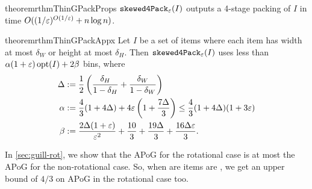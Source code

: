 \begin{restatable}{theorem}{rthmThinGPackProps}
\label{thm:thin-gpack-props}
$\operatorname{\mathtt{skewed4Pack}}_{\varepsilon}(I)$ outputs a 4-stage packing of $I$ in time
$O((1/\varepsilon)^{O(1/\varepsilon)} + n\log n)$.
\end{restatable}

\begin{restatable}{theorem}{rthmThinGPackAppx}
\label{thm:thin-gpack-appx}
Let $I$ be a set of items where each item has width at most $\delta_W$
or height at most $\delta_H$. Then $\operatorname{\mathtt{skewed4Pack}}_{\varepsilon}(I)$ uses less than
$\alpha(1+\varepsilon)\operatorname{opt}(I) + 2\beta$ bins, where
\begin{align*}
\Delta &:= \frac{1}{2}\left(\frac{\delta_H}{1-\delta_H}
    + \frac{\delta_W}{1-\delta_W}\right)
\\ \alpha &:= \frac{4}{3}(1+4\Delta) + 4\varepsilon\left(1 + \frac{7\Delta}{3}\right)
    \le \frac{4}{3}(1+4\Delta)(1+3\varepsilon)
\\ \beta &:= \frac{2\Delta(1+\varepsilon)}{\varepsilon^2} + \frac{10}{3}
    + \frac{19\Delta}{3} + \frac{16\Delta\varepsilon}{3}.
\end{align*}
\end{restatable}

In \cref{sec:guill-rot}, we show that the APoG for the rotational case
is at most the APoG for the non-rotational case.
So, when are items are \thin{}, we get an upper bound of $4/3$ on APoG
in the rotational case too.
